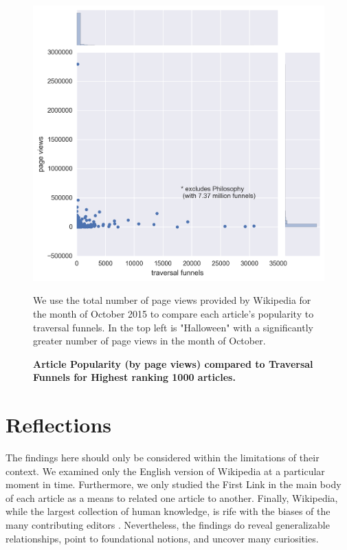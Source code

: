 \documentclass[pre,twocolumn,twoside,superscriptaddress,floatfix, aps, 10pt]{revtex4-1}
\begin{document}
\begin{figure}[tp!]
  \centering	
  \includegraphics[width=\columnwidth]{graphics/funnels_visits.png}
  \caption{
    \textbf{Article Popularity (by page views) compared to Traversal Funnels
    for Highest ranking 1000 articles.}
  }
    We use the total number of page views provided by Wikipedia for the month
    of October 2015 to compare each article's popularity to traversal funnels.
    In the top left is "Halloween" with a significantly greater 
    number of page views in the month of October.
  \label{fig:Views and Funnels}
\end{figure}




\section{Reflections}

The findings here should only be considered within the limitations of their context.
We examined only the English version of Wikipedia at a particular moment in time.
Furthermore, we only studied the First Link in the main body  of each article
as a means to related one article to another. Finally, Wikipedia, while the largest 
collection of human knowledge, is rife with the biases of the many contributing editors
\cite{bias}
. Nevertheless, the findings do reveal
generalizable relationships, point to foundational notions, and uncover many curiosities.
\end{document}
